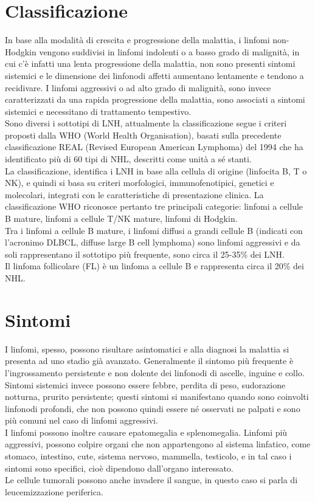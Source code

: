 \section{Classificazione}
In base alla modalità di crescita e progressione della malattia, i linfomi non-Hodgkin vengono suddivisi in 
linfomi indolenti o a basso grado di malignità, in cui c’è infatti una lenta progressione della malattia, 
non sono presenti sintomi sistemici e le dimensione dei linfonodi affetti aumentano lentamente e tendono a recidivare. 
I linfomi aggressivi o ad alto grado di malignità, sono invece caratterizzati da una rapida progressione della malattia, 
sono associati a sintomi sistemici e necessitano di trattamento tempestivo\cite{reteveneta}.\\

Sono diversi i sottotipi di LNH, attualmente la classificazione segue i criteri proposti dalla WHO 
(World Health Organisation), basati sulla precedente classificazione REAL (Revised European American Lymphoma) 
del 1994 che ha identificato più di 60 tipi di NHL, descritti come unità a sé stanti\cite{AIOM}.\\
La classificazione, identifica i LNH in base alla cellula di origine (linfocita B, T o NK), e quindi si basa su 
criteri morfologici, immunofenotipici, genetici e molecolari, integrati con le caratteristiche di presentazione clinica. 
La classificazione WHO riconosce pertanto tre principali categorie: linfomi a cellule B mature, linfomi a cellule T/NK
mature, linfomi di Hodgkin\cite{AIOM}.\\
Tra i linfomi a cellule B mature, i linfomi diffusi a grandi cellule B (indicati con l’acronimo DLBCL, 
diffuse large B cell lymphoma) sono linfomi aggressivi e da soli rappresentano il sottotipo più frequente, 
sono circa il 25-35\% dei LNH\cite{AIOM}.\\
Il linfoma follicolare (FL) è un linfoma a cellule B e rappresenta circa il 20\% dei NHL.\\

\section{Sintomi}
I linfomi, spesso, possono risultare asintomatici e alla diagnosi la malattia si presenta ad uno stadio già avanzato.
Generalmente il sintomo più frequente è l’ingrossamento persistente e non dolente dei linfonodi di ascelle, inguine e 
collo.\\ 
Sintomi sistemici invece possono essere febbre, perdita di peso, sudorazione notturna, prurito persistente; 
questi sintomi si manifestano quando sono coinvolti linfonodi profondi, che non possono quindi essere né osservati 
ne palpati e sono più comuni nel caso di linfomi aggressivi.\\ 
I linfomi possono inoltre causare epatomegalia e splenomegalia. 
Linfomi più aggressivi, possono colpire organi che non appartengono al sistema linfatico, come stomaco, intestino, 
cute, sistema nervoso, mammella, testicolo, e in tal caso i sintomi sono specifici, cioè dipendono 
dall’organo interessato.\\ 
Le cellule tumorali possono anche invadere il sangue, in questo caso si parla di leucemizzazione periferica.

